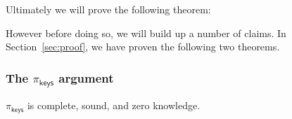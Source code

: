 Ultimately we will prove the following theorem:

\thmmaster*

However before doing so, we will build up a number of claims. In Section~\ref{sec:proof}, we have proven the following two theorems.

\sigmaclaim*

\nizkclaim*



\subsubsection{The $\pi_\mathsf{keys}$ argument}

\begin{claim}\label{thm:keys} $\pi_\mathsf{keys}$ is complete, sound, and zero knowledge. \end{claim}

